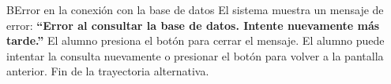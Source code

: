 \begin{UCtrayectoriaA}{B}{Error en la conexión con la base de datos}
	\UCpaso El sistema muestra un mensaje de error: {\bf ``Error al consultar la base de datos. Intente nuevamente más tarde.''}
	\UCpaso[\UCactor] El alumno presiona el botón  para cerrar el mensaje.
	\UCpaso[\UCactor] El alumno puede intentar la consulta nuevamente o presionar el botón  para volver a la pantalla anterior.
	\UCpaso Fin de la trayectoria alternativa.
\end{UCtrayectoriaA}

